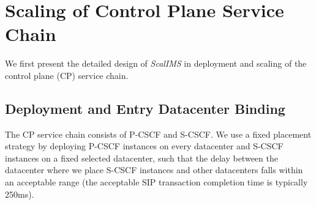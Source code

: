 \section{Scaling of Control Plane Service Chain}
\label{System-Design}
We first present the detailed design of \textit{ScalIMS} in deployment and scaling of the control plane (CP) service chain. %

\subsection{Deployment and Entry Datacenter Binding}

The CP service chain consists of P-CSCF and S-CSCF. We use a fixed placement strategy by deploying P-CSCF instances on every datacenter and S-CSCF instances on a fixed selected datacenter, such that the delay between the datacenter where we place S-CSCF instances and other datacenters falls within an acceptable range (the acceptable SIP transaction completion time is typically 250ms).

